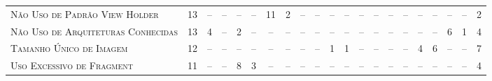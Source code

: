 \begin{table*}
\begin{tabular}{@{}p{4.2cm}p{0.3cm}p{.2cm}p{.2cm}p{.2cm}p{.2cm}p{.2cm}p{.2cm}p{.2cm}p{.2cm}p{.2cm}p{.4cm}p{.4cm}p{.4cm}p{.4cm}p{.4cm}p{.4cm}p{.4cm}p{.4cm}p{.4cm}p{0.2cm}@{}}
\textsc{Não Uso de Padrão View Holder}     	& \multicolumn{1}{c}{13} 	& \multicolumn{1}{c}{--} 	& \multicolumn{1}{c}{--} 	& \multicolumn{1}{c}{--} 	& \multicolumn{1}{c}{--} 	& \multicolumn{1}{c}{11} 	& \multicolumn{1}{c}{2} 	& \multicolumn{1}{c}{--} 	& \multicolumn{1}{c}{--} 	& \multicolumn{1}{c}{--} 	& \multicolumn{1}{c}{--} 	& \multicolumn{1}{c}{--} 	& \multicolumn{1}{c}{--} 	& \multicolumn{1}{c}{--} 	& \multicolumn{1}{c}{--} 	& \multicolumn{1}{c}{--}	& \multicolumn{1}{c}{--} 	& \multicolumn{1}{c}{--} 	& \multicolumn{1}{c}{--} 	& \multicolumn{1}{c}{2} \\
\textsc{Não Uso de Arquiteturas Conhecidas}	& \multicolumn{1}{c}{13} 	& \multicolumn{1}{c}{4} 	& \multicolumn{1}{c}{--} 	& \multicolumn{1}{c}{2}	 	& \multicolumn{1}{c}{--} 	& \multicolumn{1}{c}{--} 	& \multicolumn{1}{c}{--} 	& \multicolumn{1}{c}{--} 	& \multicolumn{1}{c}{--} 	& \multicolumn{1}{c}{--} 	& \multicolumn{1}{c}{--} 	& \multicolumn{1}{c}{--} 	& \multicolumn{1}{c}{--} 	& \multicolumn{1}{c}{--} 	& \multicolumn{1}{c}{--} 	& \multicolumn{1}{c}{--}	& \multicolumn{1}{c}{--} 	& \multicolumn{1}{c}{6} 	& \multicolumn{1}{c}{1} 	& \multicolumn{1}{c}{4} \\
\textsc{Tamanho Único de Imagem}           	& \multicolumn{1}{c}{12} 	& \multicolumn{1}{c}{--} 	& \multicolumn{1}{c}{--} 	& \multicolumn{1}{c}{--} 	& \multicolumn{1}{c}{--} 	& \multicolumn{1}{c}{--} 	& \multicolumn{1}{c}{--} 	& \multicolumn{1}{c}{--} 	& \multicolumn{1}{c}{--} 	& \multicolumn{1}{c}{1} 	& \multicolumn{1}{c}{1} 	& \multicolumn{1}{c}{--} 	& \multicolumn{1}{c}{--} 	& \multicolumn{1}{c}{--} 	& \multicolumn{1}{c}{--} 	& \multicolumn{1}{c}{4}		& \multicolumn{1}{c}{6} 	& \multicolumn{1}{c}{--} 	& \multicolumn{1}{c}{--} 	& \multicolumn{1}{c}{7} \\
\textsc{Uso Excessivo de Fragment}         	& \multicolumn{1}{c}{11} 	& \multicolumn{1}{c}{--} 	& \multicolumn{1}{c}{--} 	& \multicolumn{1}{c}{8}	 	& \multicolumn{1}{c}{3} 	& \multicolumn{1}{c}{--} 	& \multicolumn{1}{c}{--} 	& \multicolumn{1}{c}{--} 	& \multicolumn{1}{c}{--} 	& \multicolumn{1}{c}{--} 	& \multicolumn{1}{c}{--} 	& \multicolumn{1}{c}{--} 	& \multicolumn{1}{c}{--} 	& \multicolumn{1}{c}{--} 	& \multicolumn{1}{c}{--} 	& \multicolumn{1}{c}{--}	& \multicolumn{1}{c}{--} 	& \multicolumn{1}{c}{--} 	& \multicolumn{1}{c}{--} 	& \multicolumn{1}{c}{4} \\

\end{tabular}
\end{table*}
